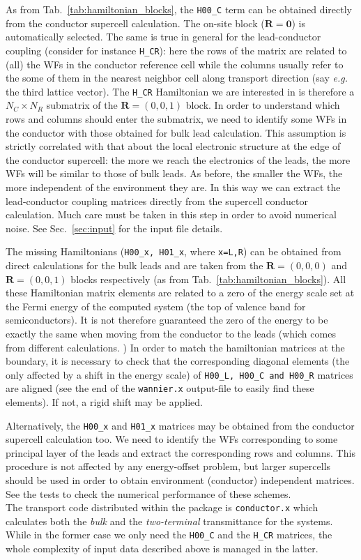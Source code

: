 As from Tab.~\ref{tab:hamiltonian_blocks}, the {\tt H00\_C} term
can be obtained directly from the conductor supercell calculation.
The on-site block ($\mathbf{R}=\mathbf{0}$) is automatically
selected. The same is true in general for the lead-conductor
coupling (consider for instance {\tt H\_CR}): here the rows of the
matrix are related to (all) the WFs in the conductor reference
cell while the columns usually refer to the some of them in the
nearest neighbor cell along transport direction (say {\it e.g.}
the third lattice vector). The {\tt H\_CR} Hamiltonian we are
interested in is therefore a $N_C \times N_R$ submatrix of the
$\mathbf{R}=(0,0,1)$ block. In order to understand which rows and
columns should enter the submatrix, we need to identify some WFs
in the conductor with those obtained for bulk lead calculation.
This assumption is strictly correlated with that about the local
electronic structure at the edge of the conductor supercell: the
more we reach the electronics of the leads, the more WFs will be
similar to those of bulk leads. As before, the smaller the WFs,
the more independent of the environment they are. In this way we
can extract the lead-conductor coupling matrices directly from the
supercell conductor calculation. Much care must be taken in this
step in order to avoid numerical noise. See Sec.~\ref{sec:input}
for the input file details.

The missing Hamiltonians ({\tt H00\_x, H01\_x}, where {\tt x=L,R})
can be obtained from direct calculations for the bulk leads and
are taken from the $\mathbf{R}=(0,0,0)$ and $\mathbf{R}=(0,0,1)$
blocks respectively (as from Tab.~\ref{tab:hamiltonian_blocks}).
All these Hamiltonian matrix elements are related to a zero of the
energy scale set at the Fermi energy of the computed system (the
top of valence band for semiconductors). It is not therefore
guaranteed the zero of the energy to be exactly the same when
moving from the conductor to the leads (which comes from different
calculations. ) In order to match the hamiltonian matrices at the
boundary, it is necessary to check that the corresponding diagonal
elements (the only affected by a shift in the energy scale) of
{\tt H00\_L, H00\_C and H00\_R} matrices are aligned (see the end
of the {\tt wannier.x} output-file to easily find these elements).
If not, a rigid shift may be applied.

Alternatively, the {\tt H00\_x} and {\tt H01\_x} matrices may be
obtained from the conductor supercell calculation too. We need to
identify the WFs corresponding to some principal layer of the
leads and extract the corresponding rows and columns. This
procedure is not affected by any energy-offset problem, but larger
supercells should be used in order to obtain environment
(conductor) independent matrices. See the tests to check the
numerical performance of these schemes.
%
\\

\noindent The transport code distributed within the \WANT{} package is
{\tt conductor.x} which calculates both the
{\em bulk} and the {\em two-terminal} transmittance for the systems.
While in the former case we
only need the {\tt H00\_C} and the {\tt H\_CR} matrices, the whole complexity
of input data described above is managed in the latter.
